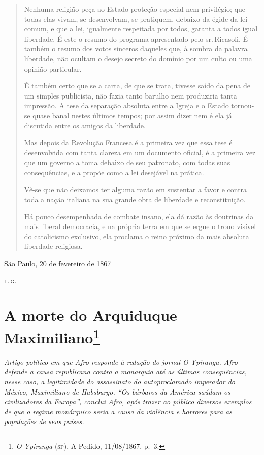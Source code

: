 \begin{quote}
Nenhuma religião peça ao Estado proteção especial nem privilégio; que
todas elas vivam, se desenvolvam, se pratiquem, debaixo da égide da lei
comum, e que a lei, igualmente respeitada por todos, garanta a todos
igual liberdade. É este o resumo do programa apresentado pelo sr.\,Ricasoli. É também o resumo dos votos sinceros daqueles que, à sombra da
palavra liberdade, não ocultam o desejo secreto do domínio por um culto
ou uma opinião particular.

É também certo que se a carta, de que se trata, tivesse saído da pena de
um simples publicista, não fazia tanto barulho nem produziria tanta
impressão. A tese da separação absoluta entre a Igreja e o Estado
tornou-se quase banal nestes últimos tempos; por assim dizer nem é ela
já discutida entre os amigos da liberdade.

Mas depois da Revolução Francesa é a primeira vez que essa tese é
desenvolvida com tanta clareza em um documento oficial, é a primeira vez
que um governo a toma debaixo de seu patronato, com todas suas
consequências, e a propõe como a lei desejável na prática.

Vê-se que não deixamos ter alguma razão em sustentar a favor e contra
toda a nação italiana na sua grande obra de liberdade e reconstituição.

Há pouco desempenhada de combate insano, ela dá razão às doutrinas da
mais liberal democracia, e na própria terra em que se ergue o trono
visível do catolicismo exclusivo, ela proclama o reino próximo da mais
absoluta liberdade religiosa.
\end{quote}

\begin{flushright}
São Paulo, 20 de fevereiro de 1867

\textsc{l.\,g.}
\end{flushright}

\chapter{A morte do Arquiduque Maximiliano\footnote{\emph{O Ypiranga} (\textsc{sp}), A Pedido,
  11/08/1867, p.~3.}}

\begin{didascalia}\itshape
Artigo político em que Afro responde à redação do jornal \textnormal{O
Ypiranga}. Afro defende a causa republicana contra a
monarquia até as últimas consequências, nesse caso, a legitimidade do
assassinato do autoproclamado imperador do México, Maximiliano de
Habsburgo. ``Os bárbaros da América saúdam os civilizadores da Europa'',
conclui Afro, após trazer ao público diversos exemplos de que o regime
monárquico seria a causa da violência e horrores para as populações de
seus países.
\end{didascalia}



